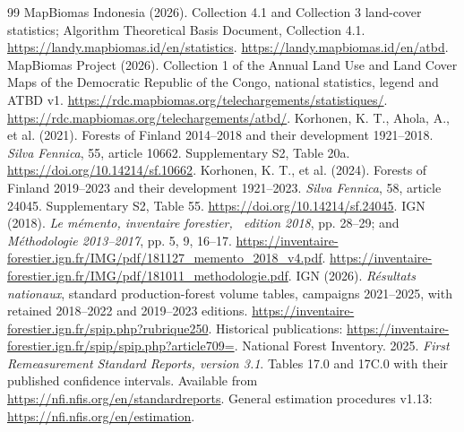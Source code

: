 \documentclass[11pt,a4paper]{article}
\begin{document}
\begin{thebibliography}{99}
 MapBiomas Indonesia (2026). Collection 4.1 and Collection 3 land-cover statistics; Algorithm Theoretical Basis Document, Collection 4.1. \url{https://landy.mapbiomas.id/en/statistics}. \url{https://landy.mapbiomas.id/en/atbd}.
 MapBiomas Project (2026). Collection 1 of the Annual Land Use and Land Cover Maps of the Democratic Republic of the Congo, national statistics, legend and ATBD v1. \url{https://rdc.mapbiomas.org/telechargements/statistiques/}. \url{https://rdc.mapbiomas.org/telechargements/atbd/}.
 Korhonen, K. T., Ahola, A., et al. (2021). Forests of Finland 2014--2018 and their development 1921--2018. \emph{Silva Fennica}, 55, article 10662. Supplementary S2, Table 20a. \url{https://doi.org/10.14214/sf.10662}.
 Korhonen, K. T., et al. (2024). Forests of Finland 2019--2023 and their development 1921--2023. \emph{Silva Fennica}, 58, article 24045. Supplementary S2, Table 55. \url{https://doi.org/10.14214/sf.24045}.
 IGN (2018). \emph{Le m\'emento, inventaire forestier, \ edition 2018}, pp. 28--29; and \emph{M\'ethodologie 2013--2017}, pp. 5, 9, 16--17. \url{https://inventaire-forestier.ign.fr/IMG/pdf/181127_memento_2018_v4.pdf}. \url{https://inventaire-forestier.ign.fr/IMG/pdf/181011_methodologie.pdf}.
 IGN (2026). \emph{R\'esultats nationaux}, standard production-forest volume tables, campaigns 2021--2025, with retained 2018--2022 and 2019--2023 editions. \url{https://inventaire-forestier.ign.fr/spip.php?rubrique250}. Historical publications: \url{https://inventaire-forestier.ign.fr/spip/spip.php?article709=}.
 National Forest Inventory. 2025. \emph{First Remeasurement Standard Reports, version 3.1}. Tables 17.0 and 17C.0 with their published confidence intervals. Available from \url{https://nfi.nfis.org/en/standardreports}. General estimation procedures v1.13: \url{https://nfi.nfis.org/en/estimation}.


\end{thebibliography}
\end{document}
